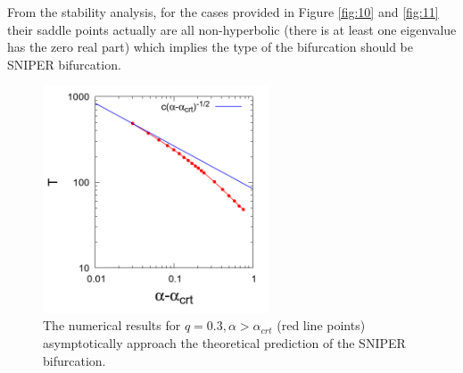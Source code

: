 \documentclass[lineno]{JFM-FLM_Au}
\begin{document}
From the stability analysis, for the cases provided in Figure \ref{fig:10} and \ref{fig:11} their saddle points actually are all non-hyperbolic (there is at least one eigenvalue has the zero real part) which implies the type of the bifurcation should be SNIPER bifurcation.
\begin{figure}[!h]
	\begin{center}
		\includegraphics[width=0.6\textwidth]{plot/T_alpha_plots/I_0.0003000_q_0.300_initial_-4.80_element_20_T_alpha_plot_new.png}
		\caption{The numerical results for $q=0.3, \alpha>\alpha_{crt}$ (red line points) asymptotically approach the theoretical prediction of the SNIPER bifurcation.}
		\label{fig:25}
	\end{center}
\end{figure}

\end{document}
